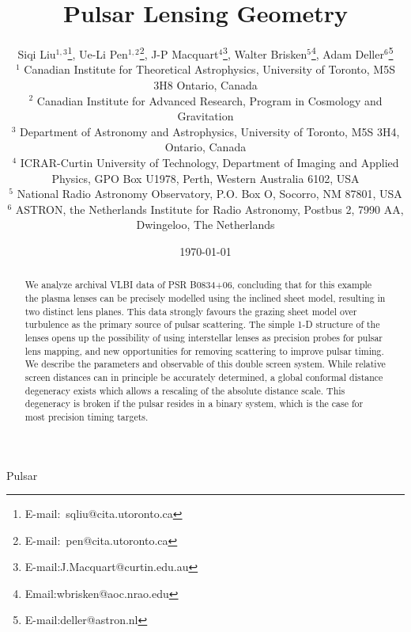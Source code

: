 \documentclass[useAMS,usenatbib]{mn2e}
\begin{document}
\title[Lensing Geometry]{
Pulsar Lensing Geometry
}

\author[Liu et al]{Siqi Liu$^{1,3}$\thanks{E-mail:\ sqliu@cita.utoronto.ca}, Ue-Li
  Pen$^{1,2}$\thanks{E-mail:\ pen@cita.utoronto.ca}, J-P Macquart$^{4}$\thanks{E-mail:J.Macquart@curtin.edu.au},
  Walter Brisken$^{5}$\thanks{Email:wbrisken@aoc.nrao.edu}, Adam Deller$^{6}$\thanks{E-mail:deller@astron.nl}\\
 $^1$ Canadian Institute for Theoretical Astrophysics, University of Toronto, M5S 3H8 Ontario, Canada \\
$^2$ Canadian Institute for Advanced Research, Program in Cosmology
and Gravitation\\
$^3$ Department of Astronomy and Astrophysics, University of Toronto, M5S 3H4, Ontario, Canada\\
$^4$ ICRAR-Curtin University of Technology, Department of Imaging and Applied Physics, GPO Box U1978, Perth, Western Australia 6102, USA \\
$^5$ National Radio Astronomy Observatory, P.O. Box O, Socorro, NM 87801, USA\\
$^6$ ASTRON, the Netherlands Institute for Radio Astronomy, Postbus 2, 7990 AA, Dwingeloo, The Netherlands\\
}

\date{\today}

\pagerange{\pageref{firstpage}--\pageref{lastpage}} 

\maketitle
\label{firstpage}
\begin{abstract}
We analyze archival VLBI data of PSR
B0834+06, concluding that for this example the plasma lenses can be
precisely modelled using the \citep{2014MNRAS.442.3338P} inclined sheet model,
resulting in two distinct lens planes.  This data strongly favours the
grazing sheet model over turbulence as the primary source of
pulsar scattering.  The simple 1-D structure of the lenses opens up
the possibility of using interstellar lenses as precision probes for
pulsar lens mapping, and new opportunities for removing scattering to
improve pulsar timing.
We describe the parameters and observable of this double screen
system.  While relative screen distances can in principle be
accurately determined,
a global conformal distance degeneracy exists which allows a rescaling
of the absolute distance scale.  This degeneracy is broken if the
pulsar resides in a binary system, which is the case for most
precision timing targets.

\end{abstract}
\begin{keywords}
Pulsar
\end{keywords}
\end{document}
